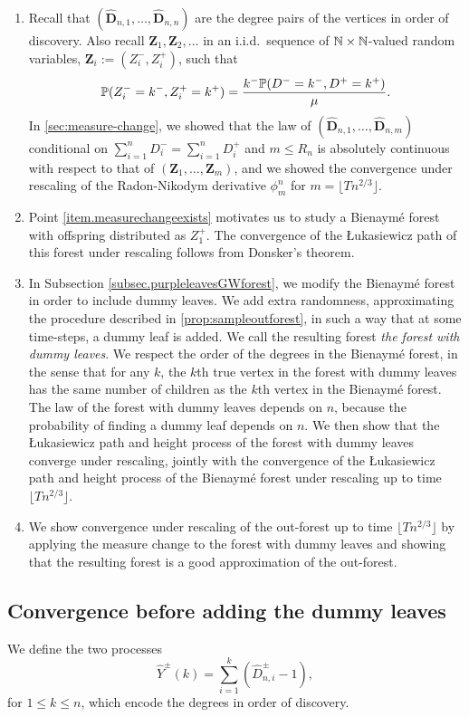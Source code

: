 \begin{enumerate}
    \item \label{item.measurechangeexists} Recall that $(\mathbf{\hat{D}}_{n,1},\dots,\mathbf{\hat{D}}_{n,n})$ are the degree pairs of the vertices in order of discovery. Also recall $\mathbf{Z}_1, \mathbf{Z}_2, \ldots$ in an i.i.d.\ sequence of $\N\times \N$-valued random variables, $\mathbf{Z}_i:=(Z_i^-,Z_i^+)$, such that 
    $$\P(Z_i^-=k^-, Z_i^+=k^+)=\frac{k^-\P(D^-=k^-,D^+=k^+)}{\mu}.$$
    In \cref{sec:measure-change}, we showed that the law of $(\mathbf{\hat{D}}_{n,1},\dots,\mathbf{\hat{D}}_{n,m})$ conditional on $\sum_{i=1}^n D_i^-=\sum_{i=1}^n D_i^+$ and $m \leq R_n$ is absolutely continuous with respect to that of $(\mathbf{Z}_1,\dots, \mathbf{Z}_m)$, and we showed the convergence under rescaling of the Radon-Nikodym derivative $\phi_m^n$ for $m=\lfloor T n^{2/3}\rfloor$. 
    \item Point \ref{item.measurechangeexists} motivates us to study a Bienaymé forest with offspring distributed as $Z_1^+$. The convergence of the \L ukasiewicz path of this forest under rescaling follows from Donsker's theorem.
    \item In Subsection \ref{subsec.purpleleavesGWforest}, we modify the Bienaymé forest in order to include dummy leaves. We add extra randomness, approximating the procedure described in \cref{prop:sampleoutforest}, in such a way that at some time-steps, a dummy leaf is added. We call the resulting forest \emph{the forest with dummy leaves}. We respect the order of the degrees in the Bienaymé forest, in the sense that for any $k$, the $k$th true vertex in the forest with dummy leaves has the same number of children as the $k$th vertex in the Bienaymé forest. The law of the forest with dummy leaves depends on $n$, because the probability of finding a dummy leaf depends on $n$. We then show that the \L ukasiewicz path and height process of the forest with dummy leaves converge under rescaling, jointly with the convergence of the \L ukasiewicz path and height process of the Bienaymé forest under rescaling up to time $\lfloor T n^{2/3}\rfloor$.
    \item We show convergence under rescaling of the out-forest up to time $\lfloor T n^{2/3}\rfloor$ by applying the measure change to the forest with dummy leaves and showing that the resulting forest is a good approximation of the out-forest. 
\end{enumerate}

\subsection{Convergence before adding the dummy leaves}
We define the two processes
$$ \hat{Y}^{\pm}(k)=\sum\limits_{i=1}^k (\hat{D}^{\pm}_{n,i}-1), $$
for $1\leq k\leq n$, which encode the degrees in order of discovery.


